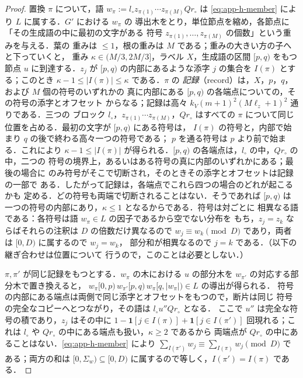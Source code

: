 \documentclass[11pt,a4paper]{ltjsarticle}
\numberwithin{equation}{section}
\theoremstyle{plain}
\theoremstyle{definition}
\theoremstyle{remark}
\theoremstyle{plain}
\begin{document}
\begin{proof}
置換 $\pi$ について，語
$w_\pi:=l_\circ z_{\pi(1)}\cdots z_{\pi(M)}Qr_\circ$ は
\eqref{eq:app-h-member} により $L$ に属する．$G'$ における $w_\pi$ の
導出木をとり，単位節点を縮め，各節点に「その生成語の中に最初の文字がある
符号 $z_{\pi(1)},\ldots,z_{\pi(M)}$ の個数」という重みを与える．葉の
重みは $\le1$，根の重みは $M$ である；重みの大きい方の子へと下っていくと，
重み $\kappa\in(M/3,2M/3]$，ラベル $X$，生成語の区間 $[p,q)$ をもつ節点
$u$ に到達する．$z_j$ が $[p,q)$ の内部にあるような添字 $j$ の集合を
$I(\pi)$ とする；このとき $\kappa-1\le|I(\pi)|\le\kappa$ である．$\pi$ の
\emph{記録}（record）は，$X$，$p$，$q$，および $M$ 個の符号のいずれかの
真に内部にある $[p,q)$ の各端点についての，その符号の添字とオフセット
からなる；記録は高々 $k_V(m+1)^2(M\ell_z+1)^2$ 通りである．三つの
ブロック $l_\circ$，$z_{\pi(1)}\cdots z_{\pi(M)}$，$Qr_\circ$ はすべての
$\pi$ について同じ位置を占める．最初の文字が $[p,q)$ にある符号は，
$I(\pi)$ の符号と，内部で始まり $q$ の後で終わる高々一つの符号である；
$p$ を通る符号は $p$ より前で始まる．これにより $\kappa-1\le|I(\pi)|$
が得られる．$[p,q)$ の各端点は，$l_\circ$ の中，$Qr_\circ$ の中，二つの
符号の境界上，あるいはある符号の真に内部のいずれかにある；最後の場合に
のみ符号がそこで切断され，そのときその添字とオフセットは記録の一部で
ある．したがって記録は，各端点でこれら四つの場合のどれが起こるかも
定める．どの符号も両端で切断されることはない．そうであれば $[p,q)$ は
一つの符号の内部にあり，$\kappa\le1$ となるからである．符号は対ごとに
相異なる語である：各符号は語 $w_\pi\in L$ の因子であるから空でない分布を
もち，$z_j=z_k$ ならばそれらの注釈は $D$ の倍数だけ異なるので
$w_j\equiv w_k\pmod D$ であり，両者は $[0,D)$ に属するので $w_j=w_k$，
部分和が相異なるので $j=k$ である．（以下の継ぎ合わせは位置について
行うので，このことは必要としない．）

$\pi,\pi'$ が同じ記録をもつとする．$w_\pi$ の木における $u$ の部分木を
$w_{\pi'}$ の対応する部分木で置き換えると，
$w_\pi[0,p)\,w_{\pi'}[p,q)\,w_\pi[q,|w_\pi|)\in L$ の導出が得られる．
符号の内部にある端点は両側で同じ添字とオフセットをもつので，断片は同じ
符号の完全なコピーへとつながり，その語は $l_\circ u''Qr_\circ$ となる．
ここで $u''$ は完全な符号の積であり，$z_j$ はその中に
$1-\mathbf 1[j\in I(\pi)]+\mathbf 1[j\in I(\pi')]$ 回現れる；これは
$l_\circ$ や $Qr_\circ$ の中にある端点も扱い，$\kappa\ge2$ であるから
両端点が $Qr_\circ$ の中にあることはない．\eqref{eq:app-h-member} により
$\sum_{I(\pi')}w_j\equiv\sum_{I(\pi)}w_j\pmod D$ である；両方の和は
$[0,\Sigma_w)\subseteq[0,D)$ に属するので等しく，$I(\pi')=I(\pi)$ である．


\end{proof}
\end{document}
